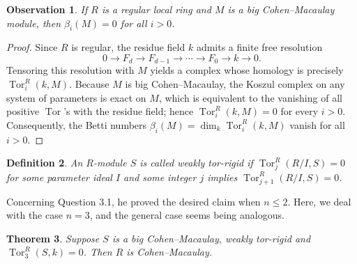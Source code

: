 \documentclass[10pt,a4paper]{amsart}
\numberwithin{equation}{section}
\newtheorem{theorem}{Theorem}[section]
\newtheorem{observation}[theorem]{Observation}
\newtheorem{definition}[theorem]{Definition}
\begin{document}
\begin{observation}\label{3.3}
	If \(R\) is a regular local ring and \(M\) is a big Cohen--Macaulay module, then \(\beta_i(M)=0\) for all \(i>0\).
\end{observation}

\begin{proof}
	Since \(R\) is regular, the residue field \(k\) admits a finite free resolution
	\[
	0 \longrightarrow F_d \longrightarrow F_{d-1} \longrightarrow \cdots \longrightarrow F_0 \longrightarrow k \longrightarrow 0.
	\]
	Tensoring this resolution with \(M\) yields a complex whose homology is precisely \(\operatorname{Tor}_i^R(k,M)\). Because \(M\) is big Cohen--Macaulay, the Koszul complex on any system of parameters is exact on \(M\), which is equivalent to the vanishing of all positive \(\operatorname{Tor}\)'s with the residue field; hence \(\operatorname{Tor}_i^R(k,M)=0\) for every \(i>0\). Consequently, the Betti numbers \(\beta_i(M)=\dim_k \operatorname{Tor}_i^R(k,M)\) vanish for all \(i>0\).
\end{proof}

\begin{definition}
	An \(R\)-module \(S\) is called \emph{weakly tor-rigid} if \(\operatorname{Tor}_j^R(R/I,S)=0\) for some parameter ideal \(I\) and some integer \(j\) implies \(\operatorname{Tor}_{j+1}^R(R/I,S)=0\).
\end{definition}
Concerning Question 3.1, he proved the desired claim when $n\leq 2$. Here, we deal with the case \(n=3\), and the general case seems being analogous.

\begin{theorem}
Suppose \(S\) is a big Cohen--Macaulay, weakly tor-rigid and  \(\operatorname{Tor}_3^R(S,k)=0\).   Then \(R\) is Cohen--Macaulay.
\end{theorem}
\end{document}
